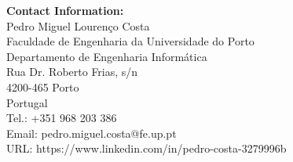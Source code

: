 \noindent\textbf{Contact Information:} \\

\noindent Pedro Miguel Lourenço Costa \\
Faculdade de Engenharia da Universidade do Porto \\
Departamento de Engenharia Informática \\

\noindent Rua Dr. Roberto Frias, s/n \\
4200-465 Porto \\
Portugal \\

\noindent Tel.: +351 968 203 386 \\
Email: pedro.miguel.costa@fe.up.pt \\
URL: https://www.linkedin.com/in/pedro-costa-3279996b \\

\vfill

